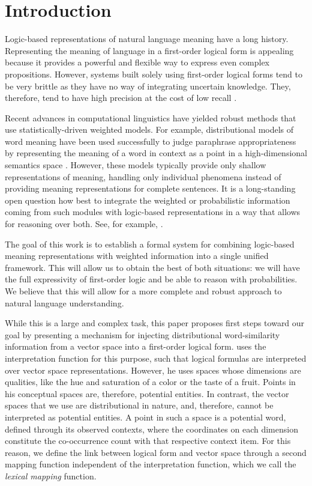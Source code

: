 \section{Introduction}

Logic-based representations of natural language meaning have a long history.
Representing the meaning of language in a first-order logical form is appealing
because it provides a powerful and flexible way to express even complex
propositions. However, systems built solely using first-order logical forms tend
to be very brittle as they have no way of integrating uncertain knowledge.
They, therefore, tend to have high precision at the cost of low recall
\citep{bos:emnlp2005}.

Recent advances in computational linguistics have yielded robust methods that
use statistically-driven weighted models.  For example, distributional
models of word meaning have been used successfully to judge paraphrase
appropriateness by representing the meaning of a word in context as a point in a
high-dimensional semantics space
\citep{erk:emnlp2008,thater:acl2010,erk:acl2010}.
However, these models typically provide only shallow representations of meaning,
handling only individual phenomena instead of providing meaning representations
for complete sentences. It is a long-standing open question how best to
integrate the weighted or probabilistic information coming from such modules
with logic-based representations in a way that allows for reasoning over both. 
See, for example, \citet{hobbs:alj93}.

The goal of this work is to establish a formal system for combining
logic-based meaning representations with weighted information into a single
unified framework.  This will allow us to obtain the best of both situations: we
will have the full expressivity of first-order logic and be able to reason with
probabilities.  We believe that this will allow for a more complete and robust
approach to natural language understanding.

While this is a large and complex task, this paper proposes first steps toward
our goal by presenting a mechanism for injecting distributional word-similarity
information from a vector space into a first-order logical form.  
\citet{gardenfors:book2004} uses the interpretation function for this purpose,
such that logical formulas are interpreted over vector space representations.
However, he uses spaces whose dimensions are qualities, like the hue and
saturation of a color or the taste of a fruit. Points in his conceptual spaces
are, therefore, potential entities.  In contrast, the vector spaces that we use
are distributional in nature, and, therefore, cannot be interpreted as potential
entities. A point in such a space is a potential word, defined through
its observed contexts, where the coordinates on each dimension constitute the
co-occurrence count with that respective context item.  For this reason, we
define the link between logical form and vector space through a second mapping
function independent of the interpretation function, which we call the
\emph{lexical mapping} function.


